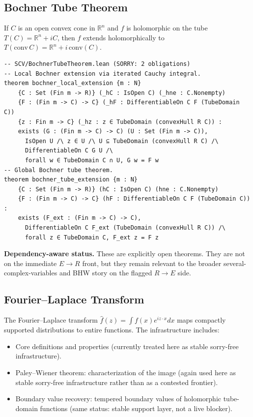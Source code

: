 \documentclass[11pt,a4paper]{article}
\begin{document}
\subsection{Bochner Tube Theorem}

If $C$ is an open convex cone in $\mathbb{R}^n$ and $f$ is holomorphic on the
tube $T(C) = \mathbb{R}^n + iC$, then $f$ extends holomorphically to
$T(\mathrm{conv}\,C) = \mathbb{R}^n + i\,\mathrm{conv}(C)$.

\begin{lstlisting}[style=leansorry]
-- SCV/BochnerTubeTheorem.lean (SORRY: 2 obligations)
-- Local Bochner extension via iterated Cauchy integral.
theorem bochner_local_extension {m : N}
    {C : Set (Fin m -> R)} (_hC : IsOpen C) (_hne : C.Nonempty)
    {F : (Fin m -> C) -> C} (_hF : DifferentiableOn C F (TubeDomain C))
    {z : Fin m -> C} (_hz : z ∈ TubeDomain (convexHull R C)) :
    exists (G : (Fin m -> C) -> C) (U : Set (Fin m -> C)),
      IsOpen U /\ z ∈ U /\ U ⊆ TubeDomain (convexHull R C) /\
      DifferentiableOn C G U /\
      forall w ∈ TubeDomain C ∩ U, G w = F w
-- Global Bochner tube theorem.
theorem bochner_tube_extension {m : N}
    {C : Set (Fin m -> R)} (hC : IsOpen C) (hne : C.Nonempty)
    {F : (Fin m -> C) -> C} (hF : DifferentiableOn C F (TubeDomain C)) :
    exists (F_ext : (Fin m -> C) -> C),
      DifferentiableOn C F_ext (TubeDomain (convexHull R C)) /\
      forall z ∈ TubeDomain C, F_ext z = F z
\end{lstlisting}

\medskip\noindent
\textbf{Dependency-aware status.}
These are explicitly open theorems. They are not on the immediate $E \to R$
front, but they remain relevant to the broader several-complex-variables and BHW
story on the flagged $R \to E$ side.

\subsection{Fourier--Laplace Transform}

The Fourier--Laplace transform $\hat{f}(z) = \int f(x) e^{iz \cdot x} dx$
maps compactly supported distributions to entire functions. The infrastructure
includes:
\begin{itemize}
\item Core definitions and properties (currently treated here as stable
  sorry-free infrastructure).
\item Paley--Wiener theorem: characterization of the image (again used here as
  stable sorry-free infrastructure rather than as a contested frontier).
\item Boundary value recovery: tempered boundary values of holomorphic
  tube-domain functions (same status: stable support layer, not a live blocker).
\end{itemize}
\end{document}

